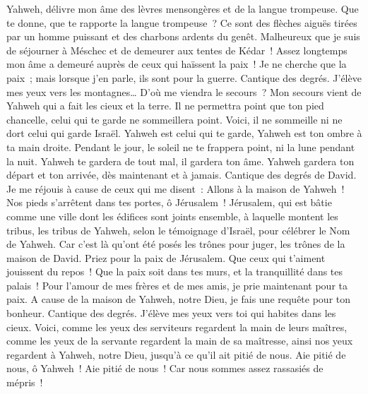 \begin{multicols}{2}
Yahweh, délivre mon âme des lèvres mensongères et de la langue trompeuse.
Que te donne, que te rapporte la langue trompeuse~?
Ce sont des flèches aiguës tirées par un homme puissant et des charbons ardents du genêt.
Malheureux que je suis de séjourner à Méschec et de demeurer aux tentes de Kédar~!
Assez longtemps mon âme a demeuré auprès de ceux qui haïssent la paix~!
Je ne cherche que la paix~; mais lorsque j'en parle, ils sont pour la guerre.
\VerseOne{}Cantique des degrés. J'élève mes yeux vers les montagnes… D'où me viendra le secours~?
Mon secours vient de Yahweh qui a fait les cieux et la terre.
Il ne permettra point que ton pied chancelle, celui qui te garde ne sommeillera point.
Voici, il ne sommeille ni ne dort celui qui garde Israël.
Yahweh est celui qui te garde, Yahweh est ton ombre à ta main droite.
Pendant le jour, le soleil ne te frappera point, ni la lune pendant la nuit.
Yahweh te gardera de tout mal, il gardera ton âme.
Yahweh gardera ton départ et ton arrivée, dès maintenant et à jamais.
\VerseOne{}Cantique des degrés de David. Je me réjouis à cause de ceux qui me disent~: Allons à la maison de Yahweh~!
Nos pieds s'arrêtent dans tes portes, ô Jérusalem~!
Jérusalem, qui est bâtie comme une ville dont les édifices sont joints ensemble,
à laquelle montent les tribus, les tribus de Yahweh, selon le témoignage d'Israël, pour célébrer le Nom de Yahweh.
Car c'est là qu'ont été posés les trônes pour juger, les trônes de la maison de David.
Priez pour la paix de Jérusalem. Que ceux qui t'aiment jouissent du repos~!
Que la paix soit dans tes murs, et la tranquillité dans tes palais~!
Pour l'amour de mes frères et de mes amis, je prie maintenant pour ta paix.
A cause de la maison de Yahweh, notre Dieu, je fais une requête pour ton bonheur.
\VerseOne{}Cantique des degrés. J'élève mes yeux vers toi qui habites dans les cieux.
Voici, comme les yeux des serviteurs regardent la main de leurs maîtres, comme les yeux de la servante regardent la main de sa maîtresse, ainsi nos yeux regardent à Yahweh, notre Dieu, jusqu'à ce qu'il ait pitié de nous.
Aie pitié de nous, ô Yahweh~! Aie pitié de nous~! Car nous sommes assez rassasiés de mépris~!

\end{multicols}
